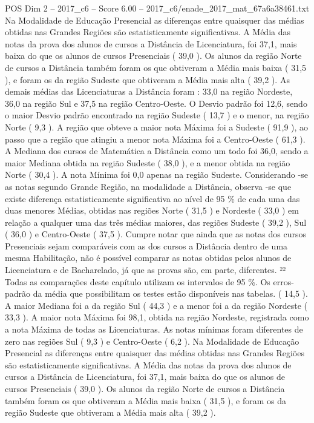 \begin{textsample}{POS Dim 2 – 2017\_c6 – Score 6.00 – 2017\_c6/enade\_2017\_mat\_67a6a38461.txt}
Na Modalidade de Educação Presencial as diferenças entre quaisquer das médias obtidas nas Grandes Regiões são estatisticamente significativas.
A Média das notas da prova dos alunos de cursos a Distância de Licenciatura, foi 37,1, mais baixa do que os alunos de cursos Presenciais ( 39,0 ).
Os alunos da região Norte de cursos a Distância também foram os que obtiveram a Média mais baixa ( 31,5 ), e foram os da região Sudeste que obtiveram a Média mais alta ( 39,2 ).
As demais médias das Licenciaturas a Distância foram : 33,0 na região Nordeste, 36,0 na região Sul e 37,5 na região Centro-Oeste.
O Desvio padrão foi 12,6, sendo o maior Desvio padrão encontrado na região Sudeste ( 13,7 ) e o menor, na região Norte ( 9,3 ).
A região que obteve a maior nota Máxima foi a Sudeste ( 91,9 ), ao passo que a região que atingiu a menor nota Máxima foi a Centro-Oeste ( 61,3 ).
A Mediana dos cursos de Matemática a Distância como um todo foi 36,0, sendo a maior Mediana obtida na região Sudeste ( 38,0 ), e a menor obtida na região Norte ( 30,4 ).
A nota Mínima foi 0,0 apenas na região Sudeste.
Considerando -se as notas segundo Grande Região, na modalidade a Distância, observa -se que existe diferença estatisticamente significativa ao nível de 95 \% de cada uma das duas menores Médias, obtidas nas regiões Norte ( 31,5 ) e Nordeste ( 33,0 ) em relação a qualquer uma das três médias maiores, das regiões Sudeste ( 39,2 ), Sul ( 36,0 ) e Centro-Oeste ( 37,5 ).
Cumpre notar que ainda que as notas dos cursos Presenciais sejam comparáveis com as dos cursos a Distância dentro de uma mesma Habilitação, não é possível comparar as notas obtidas pelos alunos de Licenciatura e de Bacharelado, já que as provas são, em parte, diferentes. ²² Todas as comparações deste capítulo utilizam os intervalos de 95 \%.
Os erros-padrão da média que possibilitam os testes estão disponíveis nas tabelas. ( 14,5 ).
A maior Mediana foi a da região Sul ( 44,3 ) e a menor foi a da região Nordeste ( 33,3 ).
A maior nota Máxima foi 98,1, obtida na região Nordeste, registrada como a nota Máxima de todas as Licenciaturas.
As notas mínimas foram diferentes de zero nas regiões Sul ( 9,3 ) e Centro-Oeste ( 6,2 ).
Na Modalidade de Educação Presencial as diferenças entre quaisquer das médias obtidas nas Grandes Regiões são estatisticamente significativas.
A Média das notas da prova dos alunos de cursos a Distância de Licenciatura, foi 37,1, mais baixa do que os alunos de cursos Presenciais ( 39,0 ).
Os alunos da região Norte de cursos a Distância também foram os que obtiveram a Média mais baixa ( 31,5 ), e foram os da região Sudeste que obtiveram a Média mais alta ( 39,2 ).

\end{textsample}
